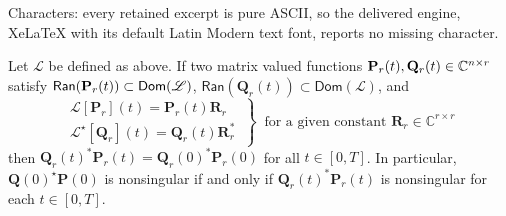 \documentclass[10pt,a4paper]{amsart}
\def\BP{{\bf P}}
\def\BQ{{\bf Q}}
\def\Lop{\mathscr{L}}
\def\bbC{{\mathbb{C}}}
\begin{document}
Characters: every retained excerpt is pure ASCII, so the delivered engine, XeLaTeX with its default Latin Modern text font, reports no missing character.
\begin{theorem} \label{thm:invSubspBases}
Let $\Lop$ be defined as above. If two matrix valued functions $\BP_r(t), \BQ_r(t)\in \bbC^{n\times r}$ satisfy $\mathsf{Ran}(\BP_r(t))\subset\mathsf{Dom}(\mathscr{L})$,
$\mathsf{Ran}(\mathbf{Q}_r(t))\subset\mathsf{Dom}(\mathscr{L})$, 
and
\begin{equation}
\label{leftrightInvariantSub}
\left.\begin{array}{c}
\mathscr{L}[\mathbf{P}_r](t)=\mathbf{P}_r(t)\mathbf{R}_{r}   \\[2mm]
\mathscr{L}^{\star}[\mathbf{Q}_r](t)=\mathbf{Q}_r(t)\mathbf{R}_{r}^{*}
\end{array}\ \right\}
\  \mbox{ for a given constant }  \mathbf{R}_r\in\mathbb{C}^{r\times r}  
\end{equation}
then $\mathbf{Q}_r(t)^{*}\mathbf{P}_r(t)=\mathbf{Q}_r(0)^{*}\mathbf{P}_r(0)$ for all $t\in[0,T]$. In particular,  $\mathbf{Q}(0)^{\star}\mathbf{P}(0)$ is nonsingular if and only if $\mathbf{Q}_r(t)^{*}\mathbf{P}_r(t)$ is nonsingular for each $t\in[0,T]$. 
\end{theorem}
\end{document}
